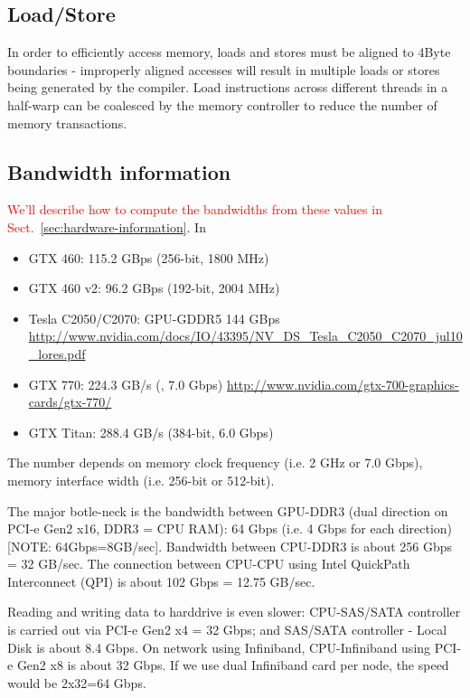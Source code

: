  
 \subsection{Load/Store}
 
 In order to efficiently access memory, loads and stores must be aligned to
 4Byte boundaries - improperly aligned accesses will result in multiple loads
 or stores being generated by the compiler.  Load instructions across different threads in
a half-warp can be coalesced by the memory controller to reduce the number of
memory transactions.
 
 
 \subsection{Bandwidth information}
 
  \textcolor{red}{We'll describe how to compute the bandwidths from
    these values in Sect.~\ref{sec:hardware-information}}. In 
    \begin{itemize}
      \item GTX 460: 115.2 GBps (256-bit, 1800 MHz)
      \item GTX 460 v2: 96.2 GBps (192-bit, 2004 MHz)
      \item Tesla C2050/C2070: GPU-GDDR5 144 GBps
      \url{http://www.nvidia.com/docs/IO/43395/NV_DS_Tesla_C2050_C2070_jul10_lores.pdf}
      \item GTX 770: 224.3 GB/s (, 7.0 Gbps)
      \url{http://www.nvidia.com/gtx-700-graphics-cards/gtx-770/}
      \item GTX Titan: 288.4 GB/s (384-bit, 6.0 Gbps)
    \end{itemize} 
The number depends on memory clock frequency (i.e. 2 GHz or 7.0 Gbps), memory
interface width (i.e. 256-bit or 512-bit).
    
    
    The major botle-neck is the bandwidth between GPU-DDR3 (dual direction on PCI-e Gen2 x16, DDR3 =
    CPU RAM): 64 Gbps (i.e. 4 Gbps for each direction) [NOTE:
    64Gbps=8GB/sec]. Bandwidth between CPU-DDR3 is about 256 Gbps = 32 GB/sec.
    The connection between CPU-CPU using Intel QuickPath Interconnect (QPI) is
    about 102 Gbps = 12.75 GB/sec. 
    
    Reading and writing data to harddrive is even
    slower:    CPU-SAS/SATA controller is carried out via PCI-e Gen2 x4 = 32 Gbps; and
    SAS/SATA controller - Local Disk is about 8.4 Gbps. On network using
    Infiniband, CPU-Infiniband using PCI-e Gen2 x8 is about 32 Gbps. If we use
    dual Infiniband card per node, the speed would be 2x32=64 Gbps. 

